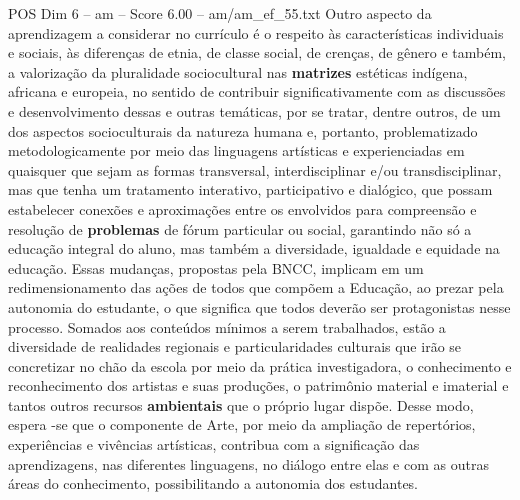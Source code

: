 \begin{textsample}{POS Dim 6 – am – Score 6.00 – am/am\_ef\_55.txt}
Outro aspecto da aprendizagem a considerar no currículo é o respeito às características individuais e sociais, às diferenças de etnia, de classe social, de crenças, de gênero e também, a valorização da pluralidade sociocultural nas \textbf{matrizes} estéticas indígena, africana e europeia, no sentido de contribuir significativamente com as discussões e desenvolvimento dessas e outras temáticas, por se tratar, dentre outros, de um dos aspectos socioculturais da natureza humana e, portanto, problematizado metodologicamente por meio das linguagens artísticas e experienciadas em quaisquer que sejam as formas transversal, interdisciplinar e/ou transdisciplinar, mas que tenha um tratamento interativo, participativo e dialógico, que possam estabelecer conexões e aproximações entre os envolvidos para compreensão e resolução de \textbf{problemas} de fórum particular ou social, garantindo não só a educação integral do aluno, mas também a diversidade, igualdade e equidade na educação.
Essas mudanças, propostas pela BNCC, implicam em um redimensionamento das ações de todos que compõem a Educação, ao prezar pela autonomia do estudante, o que significa que todos deverão ser protagonistas nesse processo.
Somados aos conteúdos mínimos a serem trabalhados, estão a diversidade de realidades regionais e particularidades culturais que irão se concretizar no chão da escola por meio da prática investigadora, o conhecimento e reconhecimento dos artistas e suas produções, o patrimônio material e imaterial e tantos outros recursos \textbf{ambientais} que o próprio lugar dispõe.
Desse modo, espera -se que o componente de Arte, por meio da ampliação de repertórios, experiências e vivências artísticas, contribua com a significação das aprendizagens, nas diferentes linguagens, no diálogo entre elas e com as outras áreas do conhecimento, possibilitando a autonomia dos estudantes.

\end{textsample}
